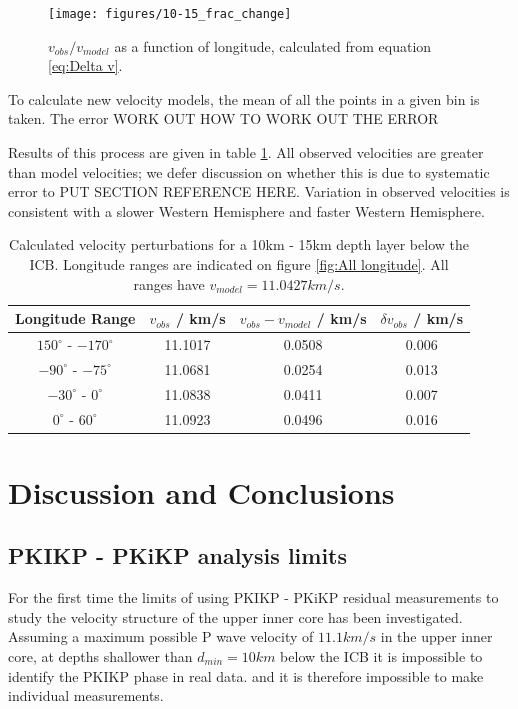 \documentclass[11pt,a4paper]{article}
\begin{document}
\begin{figure}
	\centering
	\texttt{[image: figures/10-15\_frac\_change]}
	\caption{$v_{obs} / v_{model}$ as a function of longitude, calculated from equation \eqref{eq:Delta v}.}
	\label{fig:Frac change}
\end{figure}

To calculate new velocity models, the mean of all the points in a given bin is taken. The error WORK OUT HOW TO WORK OUT THE ERROR

Results of this process are given in table \ref{tab:Velocity models}. All observed velocities are greater than model velocities; we defer discussion on whether this is due to systematic error to PUT SECTION REFERENCE HERE. Variation in observed velocities is consistent with a slower Western Hemisphere and faster Western Hemisphere.

\begin{table}
\centering
\begin{tabular}{| c | c | c | c |}
	\hline
	Longitude Range			& $v_{obs}$ / km/s	& $v_{obs} - v_{model}$ / km/s	& $\delta v_{obs}$ / km/s	\\ \hline \hline
	$150^{\circ}$ - $-170^{\circ}$	& 11.1017			& 0.0508					& 0.006				\\ \hline
	$-90^{\circ}$ - $-75^{\circ}$	& 11.0681			& 0.0254					& 0.013				\\ \hline
	$-30^{\circ}$ - $0^{\circ}$		& 11.0838			& 0.0411					& 0.007				\\ \hline
	$0^{\circ}$ - $60^{\circ}$		& 11.0923			& 0.0496					& 0.016				\\
	\hline
\end{tabular}
\caption{Calculated velocity perturbations for a 10km - 15km depth layer below the ICB. Longitude ranges are indicated on figure \ref{fig:All longitude}. All ranges have $v_{model} = 11.0427 km/s$.}
\label{tab:Velocity models}
\end{table}

\section{Discussion and Conclusions}

\subsection{PKIKP - PKiKP analysis limits}
For the first time the limits of using PKIKP - PKiKP residual measurements to study the velocity structure of the upper inner core has been investigated. Assuming a maximum possible P wave velocity of $11.1 km/s$ in the upper inner core, at depths shallower than $d_{min} = 10km$ below the ICB it is impossible to identify the PKIKP phase in real data. and it is therefore impossible to make individual measurements.
\end{document}
